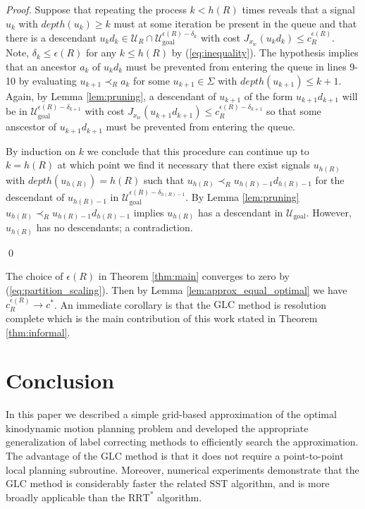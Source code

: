 \documentclass{llncs}
\newcommand{\GLC}{\ensuremath{\mathrm{GLC}}\xspace}
\newcommand{\RRTs}{\ensuremath{\mathrm{RRT}^*}\xspace}
\newcommand{\SST}{\ensuremath{\mathrm{SST}}\xspace}
\begin{document}
\begin{proof}
Suppose that repeating the process $k<h(R)$ times reveals that a signal $u_k$ with $depth(u_k)\geq k$ must at some iteration be present in the queue and that there is a descendant  $u_kd_k\in\mathcal{U}_R\cap\mathcal{U}_\mathrm{goal}^{\epsilon(R)-\delta_k}$  with cost $J_{x_\mathrm{ic}}(u_kd_k)\leq c_R^{\epsilon(R)}$.
%
Note, $\delta_k \leq \epsilon(R) $ for any $k \leq h(R)$ by (\ref{eq:inequality}).
%
The hypothesis implies that an ancestor $a_{k}$ of $u_kd_k$ must be prevented from entering the queue in lines 9-10 by evaluating $u_{k+1}\prec_R a_{k}$ for some $u_{k+1}\in \Sigma$ with $depth(u_{k+1})\leq k+1$. 
%
Again, by Lemma \ref{lem:pruning}, a descendant of $u_{k+1}$ of the form $u_{k+1}d_{k+1}$ will be in $\mathcal{U}^{\epsilon(R)-\delta_{k+1}}_\mathrm{goal}$ with cost $J_{x_\mathrm{ic}}(u_{k+1}d_{k+1})\leq c_R^{\epsilon(R)-\delta_{k+1}}$ so that some anscestor of $u_{k+1}d_{k+1}$ must be prevented from entering the queue. 

By induction on $k$ we conclude that this procedure can continue up to $k=h(R)$ at which point we find it necessary that there exist signals $u_{h(R)}$ with $depth(u_{h(R)})= h(R)$ such that $u_{h(R)}\prec_R u_{h(R)-1}d_{h(R)-1}$ for the descendant of $u_{h(R)-1}$ in $\mathcal{U}^{\epsilon(R)-\delta_{h(R)-1}}_\mathrm{goal}$. By Lemma \ref{lem:pruning} $u_{h(R)}\prec_R u_{h(R)-1}d_{h(R)-1}$ implies $u_{h(R)}$ has a descendant in $\mathcal{U}_\mathrm{goal}$. However, $u_{h(R)}$ has no descendants; a contradiction.   


\qed
\end{proof}
%

The choice of $\epsilon(R)$ in Theorem \ref{thm:main} converges to zero by  (\ref{eq:partition_scaling}).
%
Then by Lemma \ref{lem:approx_equal_optimal} we have $c_{R}^{\epsilon(R)}\rightarrow c^{*}$. 
%
An immediate corollary is that the \GLC method is resolution complete which is the main contribution of this work stated in Theorem \ref{thm:informal}.

\section{Conclusion\label{sec:Conclusions}}
%
In this paper we described a simple grid-based approximation of the optimal kinodynamic motion planning problem and developed the appropriate generalization of label correcting methods to efficiently search the approximation.
%
The advantage of the \GLC method is that it does not require a point-to-point local planning subroutine. 
%
Moreover, numerical experiments demonstrate that the \GLC method is considerably faster the related \SST algorithm, and is more broadly applicable than the \RRTs algorithm. 
\end{document}
